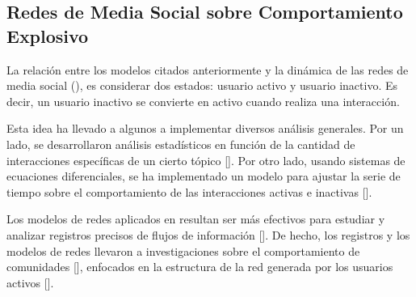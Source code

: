 \documentclass[../main.tex]{subfiles}
\begin{document}

\subsection{Redes de Media Social sobre Comportamiento Explosivo}


La relación entre los modelos citados anteriormente y la dinámica de las redes de media social (\RMS), es considerar dos estados: usuario activo y usuario inactivo. Es decir, un usuario inactivo se convierte en activo cuando realiza una interacción. 

Esta idea ha llevado a algunos a implementar diversos análisis generales. Por un lado, se desarrollaron análisis estadísticos en función de la cantidad de  interacciones específicas de un cierto tópico [\cite{an_Twitter_Zubiaga2014}]. Por otro lado, usando sistemas de ecuaciones diferenciales, se ha implementado un modelo para ajustar la serie de tiempo sobre el comportamiento de las interacciones activas e inactivas [\cite{an_Twitter_dinamics}]. 




Los modelos de redes aplicados en \RMS resultan ser más efectivos para estudiar y analizar registros precisos de flujos de información [\cite{Miller2011}]. De hecho, los registros y los modelos de redes llevaron a investigaciones sobre el comportamiento de comunidades [\cite{REDDIT, D_Weng2013}], enfocados en la estructura de la red generada por los usuarios activos [\cite{D_weng2014predicting}].


\end{document}
